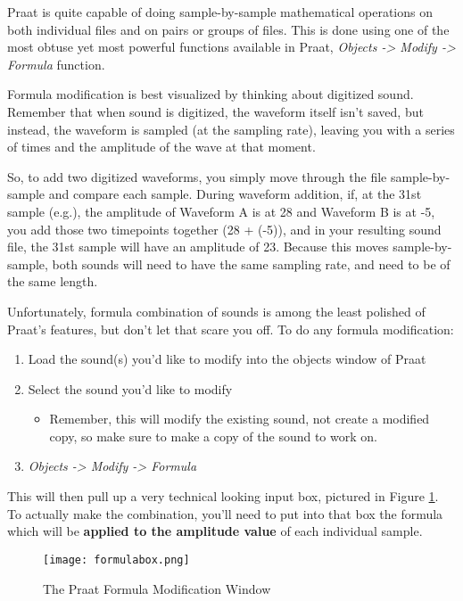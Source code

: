 \documentclass[11pt]{article}
\def\tightlist{}
\begin{document}
Praat is quite capable of doing sample-by-sample mathematical operations
on both individual files and on pairs or groups of files. This is done
using one of the most obtuse yet most powerful functions available in
Praat, \emph{Objects -\textgreater{} Modify -\textgreater{} Formula}
function.

Formula modification is best visualized by thinking about digitized
sound. Remember that when sound is digitized, the waveform itself isn't
saved, but instead, the waveform is sampled (at the sampling rate),
leaving you with a series of times and the amplitude of the wave at that
moment.

So, to add two digitized waveforms, you simply move through the file
sample-by-sample and compare each sample. During waveform addition, if,
at the 31st sample (e.g.), the amplitude of Waveform A is at 28 and
Waveform B is at -5, you add those two timepoints together (28 + (-5)),
and in your resulting sound file, the 31st sample will have an amplitude
of 23. Because this moves sample-by-sample, both sounds will need to
have the same sampling rate, and need to be of the same length.

Unfortunately, formula combination of sounds is among the least polished
of Praat's features, but don't let that scare you off. To do any formula
modification:

\begin{enumerate}
\def\labelenumi{\arabic{enumi}.}
\tightlist
\item
  Load the sound(s) you'd like to modify into the objects window of
  Praat
\item
  Select the sound you'd like to modify

  \begin{itemize}
  \tightlist
  \item
    Remember, this will modify the existing sound, not create a modified
    copy, so make sure to make a copy of the sound to work on.
  \end{itemize}
\item
  \emph{Objects -\textgreater{} Modify -\textgreater{} Formula}
\end{enumerate}

This will then pull up a very technical looking input box, pictured in
Figure \ref{formulabox}. To actually make the combination, you'll need
to put into that box the formula which will be \textbf{applied to the
amplitude value} of each individual sample.

\begin{figure}
  \centerline{
    \mbox{\texttt{[image: formulabox.png]}}
  }
  \caption{The Praat Formula Modification Window\label{formulabox}}

  \end{figure}
\end{document}
